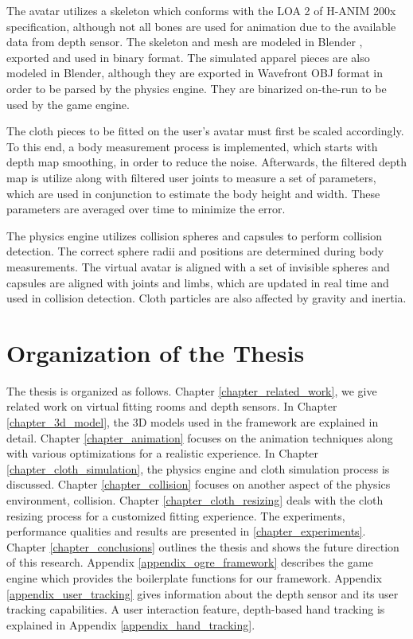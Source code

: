 The avatar utilizes a skeleton which conforms with the LOA 2 of H-ANIM 200x specification\cite{HANIM}, although not all bones are used for 
animation due to the available data from depth sensor. The skeleton and mesh are modeled in Blender \cite{Blender}, exported and used in 
binary format. The simulated apparel pieces are also modeled in Blender, although they are exported in Wavefront OBJ format in order 
to be parsed by the physics engine. They are binarized on-the-run to be used by the game engine. 

The cloth pieces to be fitted on the user's avatar must first be scaled
accordingly. To this end, a body measurement process is implemented, 
which starts with depth map smoothing, in order to reduce the noise. 
Afterwards, the filtered depth map is utilize along with filtered
user joints to measure a set of parameters, which are used in conjunction
to estimate the body height and width. These parameters are averaged over 
time to minimize the error.

The physics engine utilizes collision spheres and capsules to perform
collision detection. The correct sphere radii and positions are determined
during body measurements. The virtual avatar is aligned with a set of 
invisible spheres and capsules are aligned with joints and limbs, 
which are updated in real time and used in collision detection. 
Cloth particles are also affected by gravity and inertia.


\section{Organization of the Thesis}

The thesis is organized as follows. Chapter \ref{chapter_related_work}, we give related work on virtual fitting rooms and 
depth sensors. In Chapter \ref{chapter_3d_model}, the 3D models used in the framework are explained in detail. Chapter \ref{chapter_animation}
focuses on the animation techniques along with various optimizations for a realistic experience. In Chapter \ref{chapter_cloth_simulation}, the physics
engine and cloth simulation process is discussed. Chapter \ref{chapter_collision} focuses on another aspect of the physics environment, collision. 
Chapter \ref{chapter_cloth_resizing} deals with the cloth resizing process for a customized fitting experience. The experiments, performance qualities and 
results are presented in \ref{chapter_experiments}. Chapter \ref{chapter_conclusions} outlines the thesis and shows the future direction of this research.
Appendix \ref{appendix_ogre_framework} describes the game engine which provides the boilerplate functions for our framework. Appendix \ref{appendix_user_tracking}
gives information about the depth sensor and its user tracking capabilities. A user interaction feature, depth-based hand tracking is explained in Appendix \ref{appendix_hand_tracking}.
